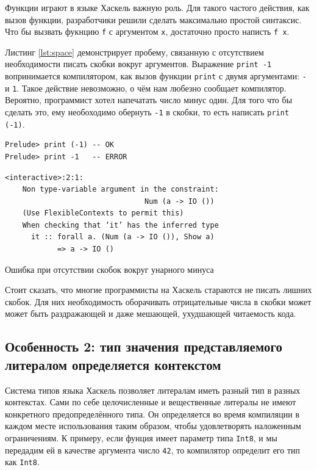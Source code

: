 Функции играют в языке Хаскель важную роль. Для такого частого действия, как
вызов функции, разработчики решили сделать максимально простой синтаксис.
Что бы вызвать фукнцию \texttt{f} с аргументом \texttt{x}, достаточно просто
написть \texttt{f x}.

Листинг \ref{lst:space} демонстрирует пробему, связанную с отсутствием
необходимости писать скобки вокруг аргументов. Выражение \texttt{print -1}
вопринимается компилятором, как вызов функции \texttt{print} с двумя
аргументами: \texttt{-} и \texttt{1}. Такое действие невозможно, о чём нам
любезно сообщает компилятор. Вероятно, программист хотел напечатать число минус
один. Для того что бы сделать это, ему необоходимо обернуть \texttt{-1} в
скобки, то есть написать \texttt{print (-1)}.

\begin{ListingEnv}[H]
\begin{lstlisting}
Prelude> print (-1) -- OK
Prelude> print -1   -- ERROR
\end{lstlisting}
\begin{verbatim}
<interactive>:2:1:
    Non type-variable argument in the constraint:
                                Num (a -> IO ())
    (Use FlexibleContexts to permit this)
    When checking that ‘it’ has the inferred type
      it :: forall a. (Num (a -> IO ()), Show a)
            => a -> IO ()
\end{verbatim}
\caption{Ошибка при отсутствии скобок вокруг унарного минуса}
\label{lst:space}
\end{ListingEnv}

Стоит сказать, что многие программисты на Хаскель стараются не писать лишних
скобок. Для них необходимость оборачивать отрицательные числа в скобки может
может быть раздражающей и даже мешающей, ухудшающей читаемость кода.

\subsection{Особенность 2: тип значения представляемого литералом определяется
контекстом}

Система типов языка Хаскель позволяет литералам иметь разный тип в разных
контекстах. Сами по себе целочисленные и вещественные литералы не имеют
конкретного предопределённого типа. Он определяется во время компиляции в
каждом месте использования таким образом, чтобы удовлетворять наложенным
ограничениям. К примеру, если фунция имеет параметр типа \texttt{Int8}, и мы
передадим ей в качестве аргумента число \texttt{42}, то компилятор определит
его тип как \texttt{Int8}.

